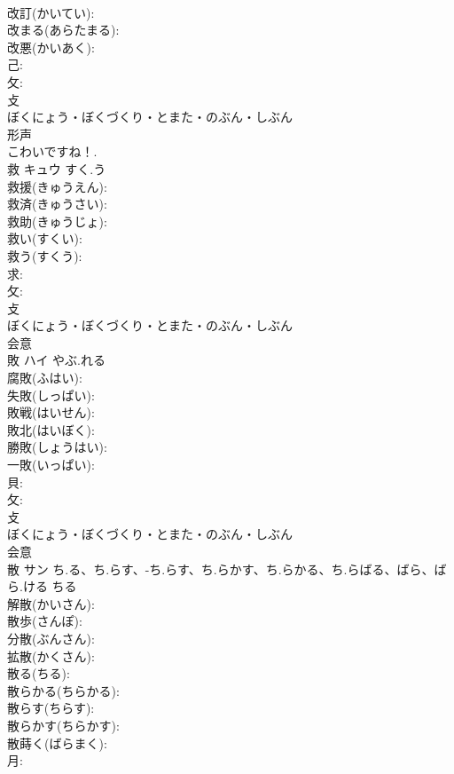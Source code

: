 \documentclass[8pt]{extreport}
\begin{document}
\begin{CJK}{UTF8}{min}
\\	改訂(かいてい): 
\\	改まる(あらたまる): 
\\	改悪(かいあく): 
\\	己: 
\\	攵: 
\\	攴	
\\	ぼくにょう・ぼくづくり・とまた・のぶん・しぶん	
\\	形声 
\\	こわいですね！.	
\\	救	キュウ	すく.う		
\\	救援(きゅうえん): 
\\	救済(きゅうさい): 
\\	救助(きゅうじょ): 
\\	救い(すくい): 
\\	救う(すくう): 
\\	求: 
\\	攵: 
\\	攴	
\\	ぼくにょう・ぼくづくり・とまた・のぶん・しぶん	
\\	会意 
\\	敗	ハイ	やぶ.れる		
\\	腐敗(ふはい): 
\\	失敗(しっぱい): 
\\	敗戦(はいせん): 
\\	敗北(はいぼく): 
\\	勝敗(しょうはい): 
\\	一敗(いっぱい): 
\\	貝: 
\\	攵: 
\\	攴	
\\	ぼくにょう・ぼくづくり・とまた・のぶん・しぶん	
\\	会意 
\\	散	サン	ち.る、ち.らす、-ち.らす、ち.らかす、ち.らかる、ち.らばる、ばら、ばら.ける	ちる	
\\	解散(かいさん): 
\\	散歩(さんぽ): 
\\	分散(ぶんさん): 
\\	拡散(かくさん): 
\\	散る(ちる): 
\\	散らかる(ちらかる): 
\\	散らす(ちらす): 
\\	散らかす(ちらかす): 
\\	散蒔く(ばらまく): 
\\	月: 

\end{CJK}
\end{document}
